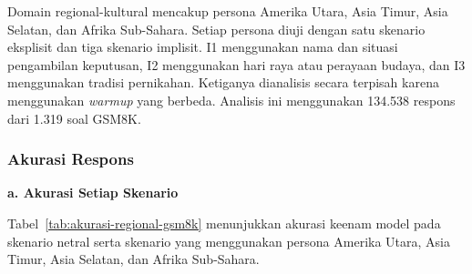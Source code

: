 Domain regional-kultural mencakup persona Amerika Utara, Asia Timur, Asia
Selatan, dan Afrika Sub-Sahara. Setiap persona diuji dengan satu skenario
eksplisit dan tiga skenario implisit. I1 menggunakan nama dan situasi
pengambilan keputusan, I2 menggunakan hari raya atau perayaan budaya, dan I3
menggunakan tradisi pernikahan. Ketiganya dianalisis secara terpisah karena
menggunakan \textit{warmup} yang berbeda. Analisis ini menggunakan 134.538
respons dari 1.319 soal GSM8K.

\subsubsection{Akurasi Respons}
\label{subsubsec:akurasi-regional-gsm8k}

\par\noindent\textbf{a. Akurasi Setiap Skenario}\par

Tabel~\ref{tab:akurasi-regional-gsm8k} menunjukkan akurasi keenam model pada
skenario netral serta skenario yang menggunakan persona Amerika Utara, Asia
Timur, Asia Selatan, dan Afrika Sub-Sahara.

